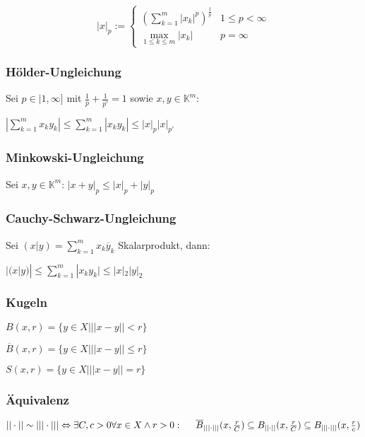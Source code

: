 $$|x|_p := \begin{cases}
	(\sum_{k=1}^m |x_k|^p )^{\frac{1}{p}} & 1 \leq p < \infty \\
	\max_{1\leq k \leq m} |x_k|           & p = \infty
\end{cases}$$

\subsubsection*{Hölder-Ungleichung}

Sei $p \in |1, \infty]$ mit $\frac{1}{p}+\frac{1}{p'}=1$ sowie $x, y \in \mathbb{K}^m$:

$|\sum_{k=1}^m x_k y_k| \leq \sum_{k=1}^m |x_k y_k| \leq |x|_p |x|_{p'}$

\subsubsection*{Minkowski-Ungleichung}

Sei $x, y \in \mathbb{K}^m$: $|x+y|_p \leq |x|_p + |y|_p$

\subsubsection*{Cauchy-Schwarz-Ungleichung}

Sei $(x|y) = \sum_{k=1}^m x_k \overline y_k$ Skalarprodukt, dann:

$|(x|y)| \leq \sum_{k=1}^m |x_k y_k| \leq |x|_2 |y|_2$

\subsubsection*{Kugeln}

\begin{description}[leftmargin=!,labelwidth=22mm]
	\item[offen] $B(x,r) = \{y \in X | ||x-y|| < r\}$
	\item[abgeschlossen] $\overline B(x,r) = \{y \in X | ||x-y|| \leq r\}$
	\item[Sphäre] $S(x,r) = \{y \in X | ||x-y|| = r\}$
\end{description}

\subsubsection*{Äquivalenz}

$||\cdot|| \sim |||\cdot||| \Leftrightarrow \exists C, c > 0 \forall x \in X \land r > 0 : \\ \hspace*{5mm} \overline B_{|||\cdot|||}(x, \frac{r}{C}) \subseteq B_{||\cdot||}(x, \frac{r}{C}) \subseteq B_{|||\cdot|||}(x, \frac{r}{c})$

